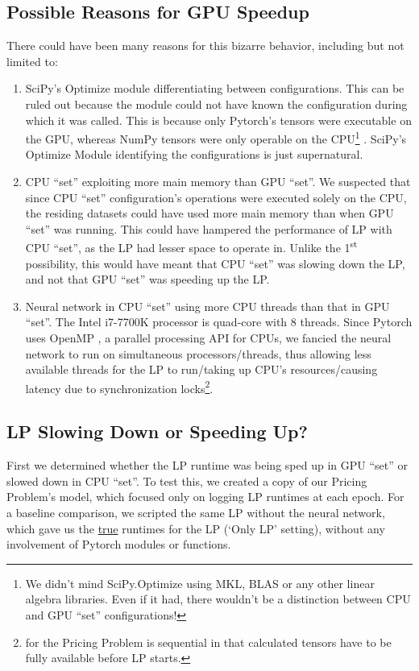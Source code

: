 \begin{appendices}
    \subsection{Possible Reasons for GPU Speedup} \label{app:Possible Reasons for GPU Speedup}
    There could have been many reasons for this bizarre behavior, including but not limited to:
    \begin{enumerate}
        \item SciPy's Optimize module differentiating between configurations. This can be ruled out because the module could not have known the configuration during which it was called. This is because only Pytorch's tensors were executable on the GPU, whereas NumPy tensors were only operable on the CPU\footnote{We didn't mind SciPy.Optimize using MKL, BLAS or any other linear algebra libraries. Even if it had, there wouldn't be a distinction between CPU and GPU ``set'' configurations!} \cite{PTDocs,NPDocs,SCPOptimizeDocs}. SciPy's Optimize Module identifying the configurations is just supernatural.
        \item CPU ``set'' exploiting more main memory than GPU ``set''. We suspected that since CPU ``set'' configuration's operations were executed solely on the CPU, the residing datasets could have used more main memory than when GPU ``set'' was running. This could have hampered the performance of LP with CPU ``set'', as the LP had lesser space to operate in. Unlike the 1\textsuperscript{st} possibility, this would have meant that CPU ``set'' was slowing down the LP, and not that GPU ``set'' was speeding up the LP.
        \item Neural network in CPU ``set'' using more CPU threads than that in GPU ``set''. The Intel i7-7700K processor is quad-core with 8 threads. Since Pytorch uses OpenMP \cite{PTDocs,OpenMP}, a parallel processing API for CPUs, we fancied the neural network to run on simultaneous processors/threads, thus allowing less available threads for the LP to run/taking up CPU's resources/causing latency due to synchronization locks\footnote{ for the Pricing Problem is sequential in that calculated tensors have to be fully available before LP starts.}.
    \end{enumerate}

    \subsection{LP Slowing Down or Speeding Up?} \label{app:LP Slowing Down or Speeding Up?}
    First we determined whether the LP runtime was being sped up in GPU ``set'' or slowed down in CPU ``set''. To test this, we created a copy of our Pricing Problem's model, which focused only on logging LP runtimes at each epoch. For a baseline comparison, we scripted the same LP without the neural network, which gave us the \underline{true} runtimes for the LP (`Only LP' setting), without any involvement of Pytorch modules or functions. 
    

\end{appendices}
